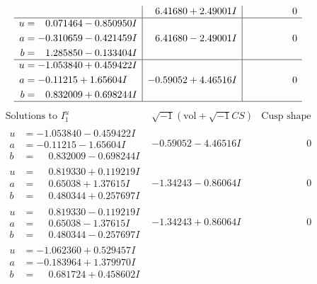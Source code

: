 \documentclass[1p]{elsarticle_modified}
\theoremstyle{definition}
\newcommand{\I}{\sqrt{-1}}
\begin{document}
$$\begin{array}{c|c|c}
 & \phantom{-}6.41680 + 2.49001 I & \phantom{-0.000000 } 0 \\ \hline\begin{aligned}
u &= \phantom{-}0.071464 - 0.850950 I \\
a &= -0.310659 - 0.421459 I \\
b &= \phantom{-}1.285850 - 0.133404 I\end{aligned}
 & \phantom{-}6.41680 - 2.49001 I & \phantom{-0.000000 } 0 \\ \hline\begin{aligned}
u &= -1.053840 + 0.459422 I \\
a &= -0.11215 + 1.65604 I \\
b &= \phantom{-}0.832009 + 0.698244 I\end{aligned}
 & -0.59052 + 4.46516 I & \phantom{-0.000000 } 0\\
 \hline 
 \end{array}$$\newpage$$\begin{array}{c|c|c}  
\text{Solutions to }I^u_{1}& \I (\text{vol} + \sqrt{-1}CS) & \text{Cusp shape}\\
 \hline 
\begin{aligned}
u &= -1.053840 - 0.459422 I \\
a &= -0.11215 - 1.65604 I \\
b &= \phantom{-}0.832009 - 0.698244 I\end{aligned}
 & -0.59052 - 4.46516 I & \phantom{-0.000000 } 0 \\ \hline\begin{aligned}
u &= \phantom{-}0.819330 + 0.119219 I \\
a &= \phantom{-}0.65038 + 1.37615 I \\
b &= \phantom{-}0.480344 + 0.257697 I\end{aligned}
 & -1.34243 - 0.86064 I & \phantom{-0.000000 } 0 \\ \hline\begin{aligned}
u &= \phantom{-}0.819330 - 0.119219 I \\
a &= \phantom{-}0.65038 - 1.37615 I \\
b &= \phantom{-}0.480344 - 0.257697 I\end{aligned}
 & -1.34243 + 0.86064 I & \phantom{-0.000000 } 0 \\ \hline\begin{aligned}
u &= -1.062360 + 0.529457 I \\
a &= -0.183964 + 1.379970 I \\
b &= \phantom{-}0.681724 + 0.458602 I\end{aligned}

\end{array}$$
\end{document}
